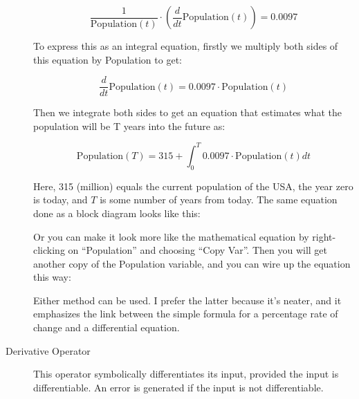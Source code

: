 \begin{description}
\begin{displaymath}
\frac{1}{\mathrm{Population}(t)}\cdot\left(\frac{d}{dt}\mathrm{Population}(t)\right)=0.0097
\end{displaymath}

To express this as an integral equation, firstly we multiply both
sides of this equation by Population to get:

\begin{displaymath}
\frac{d}{dt}\mathrm{Population}(t)=0.0097\cdot\mathrm{Population}(t)
\end{displaymath}

Then we integrate both sides to get an equation that estimates what
the population will be T years into the future as:

\begin{displaymath}
\mathrm{Population}(T)=315+\int_0^T 0.0097\cdot\mathrm{Population}(t)
dt
\end{displaymath}

Here, 315 (million) equals the current population of the USA, the year
zero is today, and $T$ is some number of years from today. The same
equation done as a block diagram looks like this: 

\begin{center}
\end{center}

Or you can make it look more like the mathematical equation by
right-clicking on ``Population'' and choosing ``Copy Var''. Then you will
get another copy of the Population variable, and you can wire up the
equation this way:

\begin{center}
\end{center}

Either method can be used. I prefer the latter because it's neater,
and it emphasizes the link between the simple formula for a percentage
rate of change and a differential equation. 

\item[Derivative Operator]  This operator symbolically differentiates its input,
provided the input is differentiable. An error is generated if the input
is not differentiable.

\end{description}

